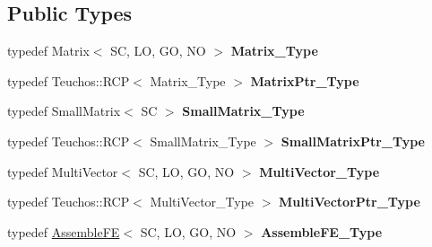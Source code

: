 \subsection*{Public Types}
\begin{DoxyCompactItemize}
\item 
\mbox{\label{classFEDD_1_1AssembleFEAceLaplace_ad5a1d233cdc46488449047924e868010}} 
typedef Matrix$<$ SC, LO, GO, NO $>$ {\bfseries Matrix\+\_\+\+Type}
\item 
\mbox{\label{classFEDD_1_1AssembleFEAceLaplace_aef601b47321c72006e231340b6b79f01}} 
typedef Teuchos\+::\+R\+CP$<$ Matrix\+\_\+\+Type $>$ {\bfseries Matrix\+Ptr\+\_\+\+Type}
\item 
\mbox{\label{classFEDD_1_1AssembleFEAceLaplace_a73514efbfcde00f29ef48aaffc8f964a}} 
typedef Small\+Matrix$<$ SC $>$ {\bfseries Small\+Matrix\+\_\+\+Type}
\item 
\mbox{\label{classFEDD_1_1AssembleFEAceLaplace_a80f37a68305eda24e2cd99eba578109b}} 
typedef Teuchos\+::\+R\+CP$<$ Small\+Matrix\+\_\+\+Type $>$ {\bfseries Small\+Matrix\+Ptr\+\_\+\+Type}
\item 
\mbox{\label{classFEDD_1_1AssembleFEAceLaplace_ab83f539437114c2bd9855d6e3e17db75}} 
typedef Multi\+Vector$<$ SC, LO, GO, NO $>$ {\bfseries Multi\+Vector\+\_\+\+Type}
\item 
\mbox{\label{classFEDD_1_1AssembleFEAceLaplace_ab530cd4249acb1258dbe16a4db4e9930}} 
typedef Teuchos\+::\+R\+CP$<$ Multi\+Vector\+\_\+\+Type $>$ {\bfseries Multi\+Vector\+Ptr\+\_\+\+Type}
\item 
\mbox{\label{classFEDD_1_1AssembleFEAceLaplace_aa8feabd583240a7d1dc1f826ac01bdff}} 
typedef \hyperlink{classFEDD_1_1AssembleFE}{Assemble\+FE}$<$ SC, LO, GO, NO $>$ {\bfseries Assemble\+F\+E\+\_\+\+Type}
\end{DoxyCompactItemize}
